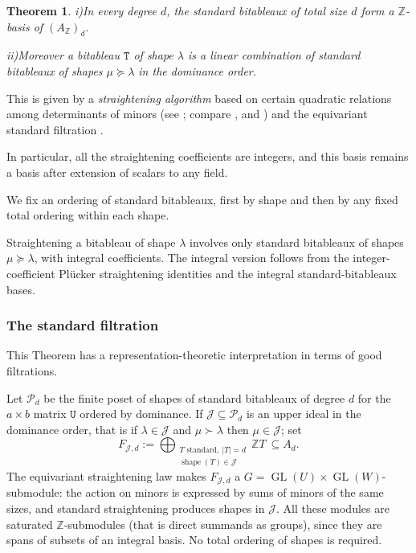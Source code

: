 \documentclass[10pt]{amsart}
\newtheorem{theorem}{Theorem}[section]
\theoremstyle{definition}
\theoremstyle{remark}
\newcommand{\GL}{\operatorname{GL}}
\begin{document}
 

\begin{theorem} 
\label{thm:GRS-standard-  bitableaux }
i)\quad In every degree $d$, the standard   bitableaux  of total size $d$
form a $\mathbb Z$-basis of $(A_{\mathbb Z})_d$.\smallskip

ii)\quad Moreover a bitableau $\mathtt T$ of shape  $\lambda$  is a linear combination of standard bitableaux of shapes $\mu\succeq\lambda$ in the  dominance order.
\end{theorem} This is given by a {\em straightening algorithm} based on certain quadratic relations among determinants of minors (see \cite[Proposition~8.24 and Theorem~8.25]{depr0};
compare \cite[Chapter~11]{BrunsVetter}, \cite{Clausen} and \cite[Chapter~3]{GrosshansRotaStein})
and the equivariant standard filtration
\cite[Definition~9.18, Theorem~9.19 and Corollary~9.20]{depr0}. \medskip

In particular, all the straightening coefficients are integers, and
this basis remains a basis after extension of scalars to any field.\smallskip


We fix an ordering of standard bitableaux, first by shape and then
by any fixed total ordering within each shape.\medskip

 
 
Straightening a bitableau of
shape $\lambda$ involves only standard bitableaux of shapes
$\mu \succeq\lambda$, with integral coefficients. The integral
version follows from the integer-coefficient Pl\"ucker straightening
identities and the integral standard-bitableaux bases.\smallskip

 
\subsubsection{The standard filtration} This Theorem has a representation-theoretic interpretation in terms of good filtrations.\smallskip


Let $\mathcal P_d$ be the finite poset of shapes of standard
bitableaux of degree $d$ for the $a\times b$ matrix $\mathtt U$ ordered by dominance.  If
$\mathcal J\subseteq\mathcal P_d$ is an upper ideal in the
dominance order, that is if  $\lambda\in \mathcal J$ and $\mu\succ \lambda$ then $\mu\in \mathcal J$; set
\begin{equation}\label{eq:ascending-good-filtration}
 F_{\mathcal J,d}:=
 \bigoplus_{\substack{T\text{ standard},\ |T|=d\\
                  \operatorname{shape}(T)\in\mathcal J}}
 \mathbb ZT\ \subseteq A_d.
\end{equation}
The equivariant straightening law makes $F_{\mathcal J,d}$
a $G=\GL(U)\times\GL(W)$-submodule:
the action on minors is expressed by sums of minors of the
same sizes, and standard straightening produces shapes in
$\mathcal J$.  All these modules are saturated $\mathbb Z$-submodules (that is direct summands as groups),
since they are spans of subsets of an integral basis.
No total ordering of shapes is required. \smallskip
\end{document}
